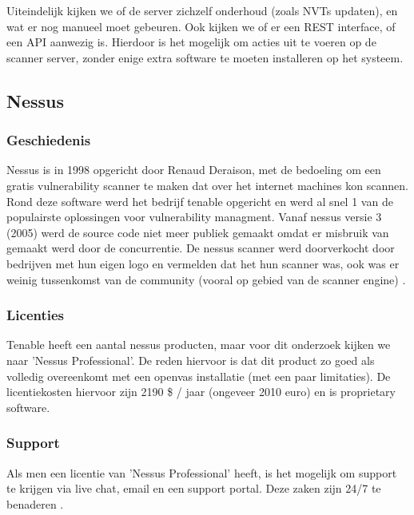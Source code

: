 Uiteindelijk kijken we of  de server zichzelf onderhoud (zoals NVTs updaten), en wat er nog manueel moet gebeuren. Ook kijken we of er een REST interface, of een API aanwezig is. Hierdoor is het mogelijk om acties uit te voeren op de scanner server, zonder enige extra software te moeten installeren op het systeem.

\subsection{Nessus}


\subsubsection{Geschiedenis}
Nessus is in 1998 opgericht door Renaud Deraison, met de bedoeling om een gratis vulnerability scanner te maken dat over het internet machines kon scannen. Rond deze software werd het bedrijf tenable opgericht en werd al snel 1 van de populairste oplossingen voor vulnerability managment. Vanaf nessus versie 3 (2005) werd de source code niet meer publiek gemaakt omdat er misbruik van gemaakt werd door de concurrentie. De nessus scanner werd doorverkocht door bedrijven met hun eigen logo en vermelden dat het hun scanner was, ook was er weinig tussenkomst van de community (vooral op gebied van de scanner engine) \textcite{Cnet}.

\subsubsection{Licenties}
Tenable heeft een aantal nessus producten, maar voor dit onderzoek kijken we naar 'Nessus Professional'. De reden hiervoor is dat dit product zo goed als volledig overeenkomt met een openvas installatie (met een paar limitaties). De licentiekosten hiervoor zijn 2190 \$ / jaar (ongeveer 2010 euro) en is proprietary software.
 
\subsubsection{Support}
Als men een licentie van 'Nessus Professional' heeft, is het mogelijk om support te krijgen via live chat, email en een support portal. Deze zaken zijn 24/7 te benaderen \textcite{Nessus-support}.
 
